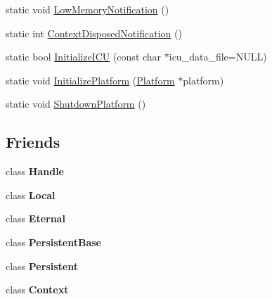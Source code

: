 \begin{DoxyCompactItemize}
\item 
static void \hyperlink{classv8_1_1V8_a7df118b9667d04903f8e9fb7452fd1ac}{Low\-Memory\-Notification} ()
\item 
static int \hyperlink{classv8_1_1V8_a06126bd2345c086a376f934ec1fbcce6}{Context\-Disposed\-Notification} ()
\item 
static bool \hyperlink{classv8_1_1V8_a525b8e053a796b880fa809d0a4fc096a}{Initialize\-I\-C\-U} (const char $\ast$icu\-\_\-data\-\_\-file=N\-U\-L\-L)
\item 
static void \hyperlink{classv8_1_1V8_a095eb8064458588a579c2b904e02dbbf}{Initialize\-Platform} (\hyperlink{classv8_1_1Platform}{Platform} $\ast$platform)
\item 
static void \hyperlink{classv8_1_1V8_a228fad83cc2fe17f10cea1a6fb6669c7}{Shutdown\-Platform} ()
\end{DoxyCompactItemize}
\subsection*{Friends}
\begin{DoxyCompactItemize}
\item 
\hypertarget{classv8_1_1V8_a9470c7f2c90465ee28ee0cd19af986ea}{class {\bfseries Handle}}\label{classv8_1_1V8_a9470c7f2c90465ee28ee0cd19af986ea}

\item 
\hypertarget{classv8_1_1V8_a0320da7f4056d4493dc1f8e49985d06e}{class {\bfseries Local}}\label{classv8_1_1V8_a0320da7f4056d4493dc1f8e49985d06e}

\item 
\hypertarget{classv8_1_1V8_a31da7f47947c3bca4f48852e61448b50}{class {\bfseries Eternal}}\label{classv8_1_1V8_a31da7f47947c3bca4f48852e61448b50}

\item 
\hypertarget{classv8_1_1V8_a8937e9c9319f676bc78975d9438314ff}{class {\bfseries Persistent\-Base}}\label{classv8_1_1V8_a8937e9c9319f676bc78975d9438314ff}

\item 
\hypertarget{classv8_1_1V8_a3f9b9166ff006dd19d2335aaf93aa937}{class {\bfseries Persistent}}\label{classv8_1_1V8_a3f9b9166ff006dd19d2335aaf93aa937}

\item 
\hypertarget{classv8_1_1V8_ac26c806e60ca4a0547680edb68f6e39b}{class {\bfseries Context}}\label{classv8_1_1V8_ac26c806e60ca4a0547680edb68f6e39b}

\end{DoxyCompactItemize}


